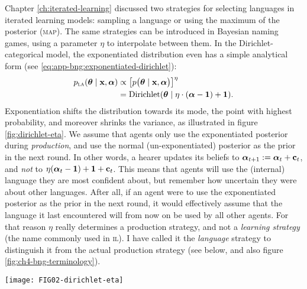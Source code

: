 \documentclass{../src/bcthesispart}
\begin{document}
Chapter \ref{ch:iterated-learning} discussed two strategies for selecting languages in iterated learning models: sampling a language or using the maximum of the posterior (\textsc{map}).
The same strategies can be introduced in Bayesian naming games, using a parameter $\eta$ to interpolate between them.
In the Dirichlet-categorical model, the exponentiated distribution even has a simple analytical form (see \eqref{eq:app-bng:exponentiated-dirichlet}):
\begin{align}
	p_{\textsc{la}}(\boldsymbol{\mathbf{\theta}} \mid \boldsymbol{\mathbf{x}}, \boldsymbol{\mathbf{\alpha}}) 
		&\propto \bigl[p\bigl(\boldsymbol{\mathbf{\theta}} \mid \boldsymbol{\mathbf{x}}, \boldsymbol{\mathbf{\alpha}}\bigr)\bigr]^\eta
		\\
		&= \text{Dirichlet}(\boldsymbol{\mathbf{\theta}} \mid \eta\cdot (\boldsymbol{\mathbf{\alpha}} - \boldsymbol{\mathbf{1}}) + \boldsymbol{\mathbf{1}}).
\end{align}
Exponentiation shifts the distribution towards its mode, the point with highest probability, and moreover shrinks the variance, as illustrated in  figure \ref{fig:dirichlet-eta}.
We assume that agents only use the exponentiated posterior during \emph{production}, and use the normal (un-exponentiated) posterior as the prior in the next round. 
In other words, a hearer updates its beliefs to $\boldsymbol{\mathbf{\alpha}}_{t+1} := \boldsymbol{\mathbf{\alpha}}_t + \boldsymbol{\mathbf{c}}_t$, and \emph{not} to $\eta (\boldsymbol{\mathbf{\alpha}}_t - \boldsymbol{\mathbf{1}}) + \boldsymbol{\mathbf{1}} + \boldsymbol{\mathbf{c}}_t$.
This means that agents will use the (internal) language they are most confident about, but remember how uncertain they were about other languages.
After all, if an agent were to use the exponentiated posterior as the prior in the next round, it would effectively assume that the language it last encountered will from now on be used by all other agents.
For that reason $\eta$ really determines a production strategy, and not a \emph{learning strategy} (the name commonly used in \textsc{il}).
I have called it the \emph{language} strategy to distinguish it from the actual production strategy (see below, and also figure \ref{fig:ch4-bng-terminology}).




\begin{SCfigure}
	\texttt{[image: FIG02-dirichlet-eta]}
	
	\caption{Exaggerating (or exponentiating) a Dirichlet distribution shrinks the variance and as $\eta$ grows, the mean approaches the mode. 
	\label{fig:dirichlet-eta}}
\end{SCfigure}
\end{document}
